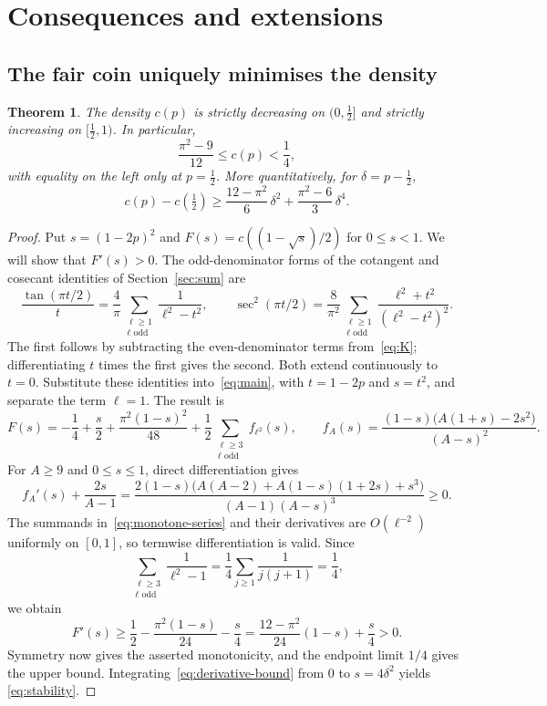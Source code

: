\documentclass[11pt]{amsart}
\newtheorem{theorem}{Theorem}[section]
\theoremstyle{definition}
\theoremstyle{remark}
\begin{document}
\section{Consequences and extensions}\label{sec:extensions}

\subsection{The fair coin uniquely minimises the density}

\begin{theorem}\label{thm:monotone}
The density $c(p)$ is strictly decreasing on $(0,\tfrac12]$ and strictly increasing on
$[\tfrac12,1)$. In particular,
\[
\frac{\pi^2-9}{12}\le c(p)<\frac14,
\]
with equality on the left only at $p=\tfrac12$. More quantitatively, for
$\delta=p-\tfrac12$,
\begin{equation}\label{eq:stability}
c(p)-c(\tfrac12)\ge\frac{12-\pi^2}{6}\,\delta^2
  +\frac{\pi^2-6}{3}\,\delta^4.
\end{equation}
\end{theorem}

\begin{proof}
Put $s=(1-2p)^2$ and $F(s)=c((1-\sqrt{s})/2)$ for $0\le s<1$. We will show that $F'(s)>0$.
The odd-denominator forms of the cotangent and cosecant identities of Section~\ref{sec:sum} are
\[
\frac{\tan(\pi t/2)}{t}=\frac4\pi\sum_{\substack{\ell\ge1\\\ell\text{ odd}}}
 \frac1{\ell^2-t^2},\qquad
\sec^2(\pi t/2)=\frac8{\pi^2}\sum_{\substack{\ell\ge1\\\ell\text{ odd}}}
 \frac{\ell^2+t^2}{(\ell^2-t^2)^2}.
\]
The first follows by subtracting the even-denominator terms from~\eqref{eq:K}; differentiating
$t$ times the first gives the second. Both extend continuously to $t=0$.
Substitute these identities into~\eqref{eq:main}, with $t=1-2p$ and $s=t^2$, and separate
the term $\ell=1$. The result is
\begin{equation}\label{eq:monotone-series}
F(s)=-\frac14+\frac{s}{2}+\frac{\pi^2(1-s)^2}{48}
 +\frac12\sum_{\substack{\ell\ge3\\\ell\text{ odd}}} f_{\ell^2}(s),\qquad
f_A(s)=\frac{(1-s)\bigl(A(1+s)-2s^2\bigr)}{(A-s)^2}.
\end{equation}
For $A\ge9$ and $0\le s\le1$, direct differentiation gives
\[
f_A'(s)+\frac{2s}{A-1}
=\frac{2(1-s)\bigl(A(A-2)+A(1-s)(1+2s)+s^3\bigr)}{(A-1)(A-s)^3}\ge0.
\]
The summands in~\eqref{eq:monotone-series} and their derivatives are $O(\ell^{-2})$ uniformly
on $[0,1]$, so termwise differentiation is valid. Since
\[
\sum_{\substack{\ell\ge3\\\ell\text{ odd}}}\frac1{\ell^2-1}
=\frac14\sum_{j\ge1}\frac1{j(j+1)}=\frac14,
\]
we obtain
\begin{equation}\label{eq:derivative-bound}
F'(s)\ge\frac12-\frac{\pi^2(1-s)}{24}-\frac{s}{4}
=\frac{12-\pi^2}{24}(1-s)+\frac{s}{4}>0.
\end{equation}
Symmetry now gives the asserted monotonicity, and the endpoint limit $1/4$ gives the upper
bound. Integrating~\eqref{eq:derivative-bound} from $0$ to $s=4\delta^2$ yields
\eqref{eq:stability}.
\end{proof}
\end{document}

